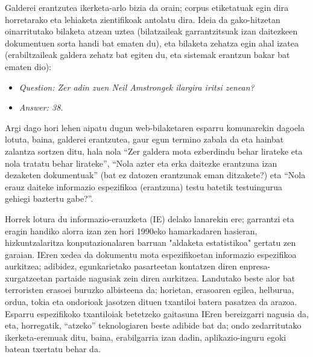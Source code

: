 \begin{multicols}{2}
Galderei erantzutea ikerketa-arlo bizia da orain; corpus etiketatuak egin dira horretarako eta lehiaketa zientifikoak antolatu dira. Ideia da gako-hitzetan oinarritutako bilaketa atzean uztea (bilatzaileak garrantzitsuak izan daitezkeen dokumentuen sorta handi bat ematen du), eta bilaketa zehatza egin ahal izatea (erabiltzaileak galdera zehatz bat egiten du, eta sistemak erantzun bakar bat ematen dio):

\begin{itemize}
\item[] \textit{Question: Zer adin zuen Neil Amstrongek ilargira iritsi zenean?}  %
\item[] \textit{Answer: 38.}  %
\end{itemize}

Argi dago hori lehen aipatu dugun web-bilaketaren esparru komunarekin dagoela lotuta, baina, galderei erantzutea, gaur egun termino zabala da eta hainbat zalantza sortzen ditu, hala nola “Zer galdera mota ezberdindu behar lirateke eta nola tratatu behar lirateke”, “Nola azter eta erka daitezke erantzuna izan dezaketen dokumentuak” (bat ez datozen erantzunak eman ditzakete?) eta “Nola erauz daiteke informazio espezifikoa (erantzuna) testu batetik testuingurua gehiegi baztertu gabe?”. 

Horrek lotura du informazio-erauzketa (IE) delako lanarekin ere; garrantzi eta eragin handiko alorra izan zen hori 1990eko hamarkadaren hasieran, hizkuntzalaritza konputazionalaren barruan "aldaketa estatistikoa" gertatu zen garaian. IEren xedea da dokumentu mota espezifikoetan informazio espezifikoa aurkitzea; adibidez, egunkarietako pasarteetan kontatzen diren enpresa-xurgatzeetan partaide nagusiak zein diren aurkitzea. Landutako beste alor bat terroristen erasoei buruzko albisteena da; horietan, erasoaren egilea, helburua, ordua, tokia eta ondorioak jasotzen dituen txantiloi batera pasatzea da arazoa. Esparru espezifikoko txantiloiak betetzeko gaitasuna IEren bereizgarri nagusia da, eta, horregatik, “atzeko” teknologiaren beste adibide bat da; ondo zedarritutako ikerketa-eremuak ditu, baina, erabilgarria izan dadin, aplikazio-inguru egoki batean txertatu behar da. 



\end{multicols}
